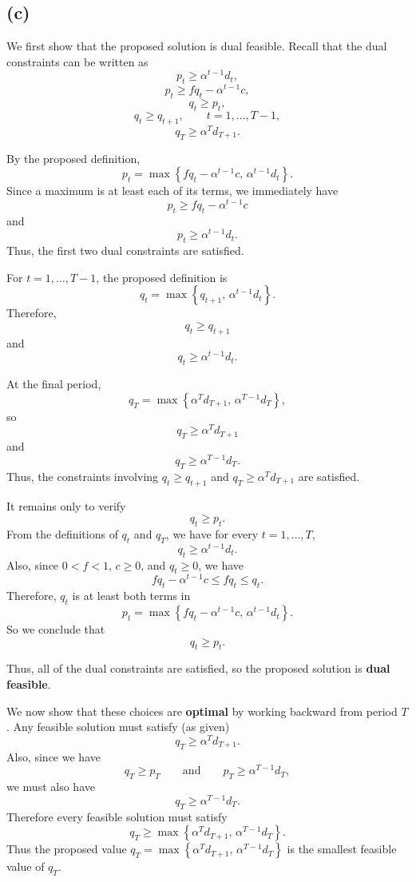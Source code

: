\documentclass{article}
\begin{document}
\vspace{5mm}
\subsection*{(c)}


We first show that the proposed solution is dual feasible. Recall that
the dual constraints can be written as
\[
p_t \geq \alpha^{t-1}d_t,
\]
\[
p_t \geq fq_t-\alpha^{t-1}c,
\]
\[
q_t \geq p_t,
\]
\[
q_t \geq q_{t+1},
\qquad t=1,\ldots,T-1,
\]
\[
q_T \geq \alpha^T d_{T+1}.
\]

By the proposed definition,
\[
p_t
=
\max\left\{
fq_t-\alpha^{t-1}c,\,
\alpha^{t-1}d_t
\right\}.
\]
Since a maximum is at least each of its terms, we immediately have
\[
p_t\geq fq_t-\alpha^{t-1}c
\]
and
\[
p_t\geq\alpha^{t-1}d_t.
\]
Thus, the first two dual constraints are satisfied.

For $t=1,\ldots,T-1$, the proposed definition is
\[
q_t
=
\max\left\{
q_{t+1},\,
\alpha^{t-1}d_t
\right\}.
\]
Therefore,
\[
q_t\geq q_{t+1}
\]
and
\[
q_t\geq\alpha^{t-1}d_t.
\]

At the final period,
\[
q_T
=
\max\left\{
\alpha^T d_{T+1},\,
\alpha^{T-1}d_T
\right\},
\]
so
\[
q_T\geq\alpha^T d_{T+1}
\]
and
\[
q_T\geq\alpha^{T-1}d_T.
\]
Thus, the constraints involving $q_t\geq q_{t+1}$ and
$q_T\geq\alpha^T d_{T+1}$ are satisfied.

It remains only to verify
\[
q_t\geq p_t.
\]
From the definitions of $q_t$ and $q_T$, we have for every
$t=1,\ldots,T$,
\[
q_t\geq\alpha^{t-1}d_t.
\]
Also, since $0<f<1$, $c\geq0$, and $q_t\geq0$, we have 
\[
fq_t-\alpha^{t-1}c
\leq fq_t
\leq q_t.
\]
Therefore, $q_t$ is at least both terms in
\[
p_t
=
\max\left\{
fq_t-\alpha^{t-1}c,\,
\alpha^{t-1}d_t
\right\}.
\]
So we conclude that 
\[
q_t\geq p_t.
\]

Thus, all of the dual constraints are satisfied, so the proposed
solution is \textbf{dual feasible}.



\vspace{3mm}
We now show that these choices are \textbf{optimal} by working backward from
period $T$. Any feasible solution must satisfy (as given)
\[
q_T\geq\alpha^T d_{T+1}.
\]
Also, since we have
\[
q_T\geq p_T
\qquad\text{and}\qquad
p_T\geq\alpha^{T-1}d_T,
\]
we must also have
\[
q_T\geq\alpha^{T-1}d_T.
\]
Therefore every feasible solution must satisfy
\[
q_T\geq
\max\left\{
\alpha^T d_{T+1},\,
\alpha^{T-1}d_T
\right\}.
\]
Thus the proposed value
$
q_T=
\max\left\{
\alpha^T d_{T+1},\,
\alpha^{T-1}d_T
\right\}
$
is the smallest feasible value of $q_T$.
\end{document}
